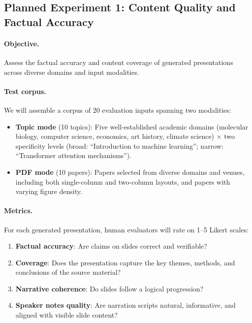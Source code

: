 \documentclass[11pt,a4paper]{article}
\begin{document}
\subsection{Planned Experiment 1: Content Quality and Factual Accuracy}
\label{sec:eval-content}

\paragraph{Objective.}
Assess the factual accuracy and content coverage of generated presentations across diverse domains and input modalities.

\paragraph{Test corpus.}
We will assemble a corpus of 20 evaluation inputs spanning two modalities:

\begin{itemize}[leftmargin=*,nosep]
    \item \textbf{Topic mode} (10 topics): Five well-established academic domains (molecular biology, computer science, economics, art history, climate science) $\times$ two specificity levels (broad: ``Introduction to machine learning''; narrow: ``Transformer attention mechanisms'').
    \item \textbf{PDF mode} (10 papers): Papers selected from diverse domains and venues, including both single-column and two-column layouts, and papers with varying figure density.
\end{itemize}

\paragraph{Metrics.}
For each generated presentation, human evaluators will rate on 1--5 Likert scales:

\begin{enumerate}[leftmargin=*,nosep]
    \item \textbf{Factual accuracy}: Are claims on slides correct and verifiable?
    \item \textbf{Coverage}: Does the presentation capture the key themes, methods, and conclusions of the source material?
    \item \textbf{Narrative coherence}: Do slides follow a logical progression?
    \item \textbf{Speaker notes quality}: Are narration scripts natural, informative, and aligned with visible slide content?
\end{enumerate}
\end{document}
